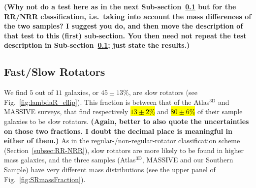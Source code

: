 \documentclass[a4paper,fleqn,usenatbib]{mnras}
\DeclareRobustCommand{\added}[1]{{\sethlcolor{green}\hl{#1}}}
\begin{document}
{\bf (Why not do a test here as in the next
  Sub-section~\ref{subsec:FR-SR} but for the RR/NRR classification,
  i.e.\ taking into account the mass differences of the two samples? I
  suggest you do, and then move the description of that test to this
  (first) sub-section. You then need not repeat the test description
  in Sub-section~\ref{subsec:FR-SR}; just state the results.)}

\subsection{Fast/Slow Rotators}
\label{subsec:FR-SR}

We find $5$ out of $11$ galaxies, or $45\pm13\%$, are slow rotators
(see Fig.~\ref{fig:lambdaR_ellip}). This fraction is between that of
the Atlas$^\text{3D}$ and MASSIVE surveys, that find respectively
\added{$13\pm2\%$} and \added{$80\pm6\%$} of their sample galaxies to be slow
rotators. {\bf (Again, better to also quote the uncertainties on those
  two fractions. I doubt the decimal place is meaningful in either of
  them.)} As in the regular-/non-regular-rotator classification scheme
(Section~\ref{subsec:RR-NRR}), slow rotators are more likely to be
found in higher mass galaxies, and the three samples
(Atlas$^\text{3D}$, MASSIVE and our Southern Sample) have very
different mass distributions (see the upper panel of
Fig.~\ref{fig:SRmassFraction}).
\end{document}
